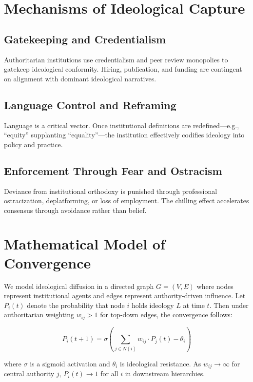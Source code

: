 \documentclass[11pt]{article}
\begin{document}
\section{Mechanisms of Ideological Capture}

\subsection{Gatekeeping and Credentialism}

Authoritarian institutions use credentialism and peer review monopolies to gatekeep ideological conformity. Hiring, publication, and funding are contingent on alignment with dominant ideological narratives.

\subsection{Language Control and Reframing}

Language is a critical vector. Once institutional definitions are redefined—e.g., “equity” supplanting “equality”—the institution effectively codifies ideology into policy and practice.

\subsection{Enforcement Through Fear and Ostracism}

Deviance from institutional orthodoxy is punished through professional ostracization, deplatforming, or loss of employment. The chilling effect accelerates consensus through avoidance rather than belief.

\section{Mathematical Model of Convergence}

We model ideological diffusion in a directed graph $G = (V, E)$ where nodes represent institutional agents and edges represent authority-driven influence. Let $P_i(t)$ denote the probability that node $i$ holds ideology $L$ at time $t$. Then under authoritarian weighting $w_{ij} > 1$ for top-down edges, the convergence follows:

\[
P_i(t+1) = \sigma\left(\sum_{j \in N(i)} w_{ij} \cdot P_j(t) - \theta_i \right)
\]

where $\sigma$ is a sigmoid activation and $\theta_i$ is ideological resistance. As $w_{ij} \to \infty$ for central authority $j$, $P_i(t) \to 1$ for all $i$ in downstream hierarchies.
\end{document}
